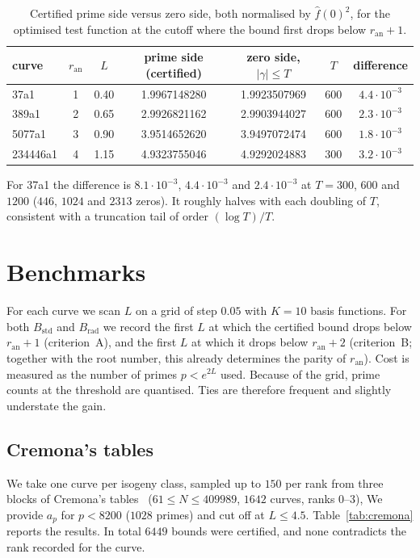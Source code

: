 \documentclass[11pt]{amsart}
\theoremstyle{remark}
\theoremstyle{definition}
\newcommand{\ran}{r_{\mathrm{an}}}
\begin{document}
\begin{table}[h]
\centering\small
\begin{tabular}{lcccccc}
\toprule
curve & $\ran$ & $L$ & prime side (certified) & zero side, $|\gamma|\le T$ & $T$ & difference\\
\midrule
37a1     & 1 & 0.40 & 1.9967148280 & 1.9923507969 & 600 & $4.4\cdot10^{-3}$\\
389a1    & 2 & 0.65 & 2.9926821162 & 2.9903944027 & 600 & $2.3\cdot10^{-3}$\\
5077a1   & 3 & 0.90 & 3.9514652620 & 3.9497072474 & 600 & $1.8\cdot10^{-3}$\\
234446a1 & 4 & 1.15 & 4.9323755046 & 4.9292024883 & 300 & $3.2\cdot10^{-3}$\\
\bottomrule
\end{tabular}
\caption{Certified prime side versus zero side, both normalised by $\hat f(0)^2$, for the optimised test function at the cutoff where the bound first drops below $\ran+1$.}
\label{tab:zeros}
\end{table}

For 37a1 the difference is $8.1\cdot10^{-3}$, $4.4\cdot10^{-3}$ and $2.4\cdot10^{-3}$ at $T=300$, $600$ and $1200$ ($446$, $1024$ and $2313$ zeros). It roughly halves with each doubling of $T$, consistent with a truncation tail of order $(\log T)/T$.

\section{Benchmarks}\label{sec:bench}

For each curve we scan $L$ on a grid of step $0.05$ with $K=10$ basis functions. For both $B_{\mathrm{std}}$ and $B_{\mathrm{rad}}$ we record the first $L$ at which the certified bound drops below $\ran+1$ (criterion~A), and the first $L$ at which it drops below $\ran+2$ (criterion~B; together with the root number, this already determines the parity of $\ran$). Cost is measured as the number of primes $p<e^{2L}$ used. Because of the grid, prime counts at the threshold are quantised. Ties are therefore frequent and slightly understate the gain.

\subsection{Cremona's tables}
We take one curve per isogeny class, sampled up to $150$ per rank from three blocks of Cremona's tables~\cite{Cremona} ($61\le N\le 409989$, $1642$ curves, ranks $0$--$3$), We provide $a_p$ for $p<8200$ ($1028$ primes) and cut off at $L\le 4.5$. Table~\ref{tab:cremona} reports the results. In total $6449$ bounds were certified, and none contradicts the rank recorded for the curve.
\end{document}
